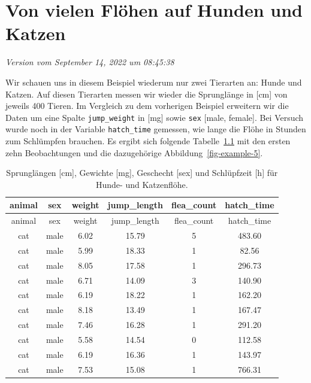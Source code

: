 \documentclass[
  letterpaper,
]{scrbook}
\begin{document}
\hypertarget{sec-example-5}{%
\chapter{Von vielen Flöhen auf Hunden und Katzen}\label{sec-example-5}}

\emph{Version vom September 14, 2022 um 08:45:38}

Wir schauen uns in diesem Beispiel wiederum nur zwei Tierarten an: Hunde
und Katzen. Auf diesen Tierarten messen wir wieder die Sprunglänge in
{[}cm{]} von jeweils 400 Tieren. Im Vergleich zu dem vorherigen Beispiel
erweitern wir die Daten um eine Spalte \texttt{jump\_weight} in {[}mg{]}
sowie \texttt{sex} {[}male, female{]}. Bei Versuch wurde noch in der
Variable \texttt{hatch\_time} gemessen, wie lange die Flöhe in Stunden
zum Schlümpfen brauchen. Es ergibt sich folgende
Tabelle~\ref{tbl-example-5} mit den ersten zehn Beobachtungen und die
dazugehörige Abbildung~\ref{fig-example-5}.

\hypertarget{tbl-example-5}{}
\begin{longtable}[]{@{}cccccc@{}}
\caption{\label{tbl-example-5}Sprunglängen {[}cm{]}, Gewichte {[}mg{]},
Geschecht {[}sex{]} und Schlüpfzeit {[}h{]} für Hunde- und
Katzenflöhe.}\tabularnewline
\toprule()
animal & sex & weight & jump\_length & flea\_count & hatch\_time \\
\midrule()
\endfirsthead
\toprule()
animal & sex & weight & jump\_length & flea\_count & hatch\_time \\
\midrule()
\endhead
cat & male & 6.02 & 15.79 & 5 & 483.60 \\
cat & male & 5.99 & 18.33 & 1 & 82.56 \\
cat & male & 8.05 & 17.58 & 1 & 296.73 \\
cat & male & 6.71 & 14.09 & 3 & 140.90 \\
cat & male & 6.19 & 18.22 & 1 & 162.20 \\
cat & male & 8.18 & 13.49 & 1 & 167.47 \\
cat & male & 7.46 & 16.28 & 1 & 291.20 \\
cat & male & 5.58 & 14.54 & 0 & 112.58 \\
cat & male & 6.19 & 16.36 & 1 & 143.97 \\
cat & male & 7.53 & 15.08 & 1 & 766.31 \\
\bottomrule()
\end{longtable}

{}
\end{document}
